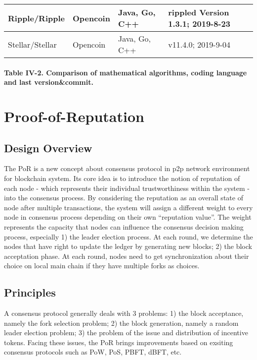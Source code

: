 \documentclass[doublespacing]{bmcart}
\begin{document}
\begin{CJK*}{UTF8}{gbsn}
\begin{tabular}{p{2cm}p{3cm}p{3cm}p{3cm}}
Ripple/Ripple & Opencoin & Java, Go, C++ & rippled Version 1.3.1; 2019-8-23 \\ \hline

Stellar/Stellar & Opencoin & Java, Go, C++ & v11.4.0; 2019-9-04 \\ \hline
\end{tabular}
\paragraph{Table IV-2. Comparison of mathematical algorithms, coding language and last version\&commit.}


\section{Proof-of-Reputation}
\renewcommand\thesubsection{\Roman{section}.\arabic{subsection}}
\subsection{Design Overview}
The PoR is a new concept about consensus protocol in p2p network environment for blockchain system. Its core idea is to introduce the notion of reputation of each node - which represents their individual trustworthiness within the system -  into the consensus process. By considering the reputation as an overall state of node after multiple transactions, the system will assign a different weight to every node  in consensus process depending on their own ``reputation value''. 
 The weight represents the capacity that nodes can influence the consensus decision making process, especially 1) the leader election process. At each round, we determine the nodes that have right to update the ledger by generating new blocks; 2) the block acceptation phase. At each round, nodes need to get synchronization about their choice on local main chain if they have multiple forks as choices.

\subsection{Principles}
A consensus protocol generally deals with 3 problems: 1) the block acceptance, namely the fork selection problem; 2) the block generation, namely a random leader election problem; 3) the problem of the issue and distribution of incentive tokens. Facing these issues, the PoR brings improvements based on exsiting consensus protocols such as PoW, PoS, PBFT, dBFT, etc.

\end{CJK*}
\end{document}
